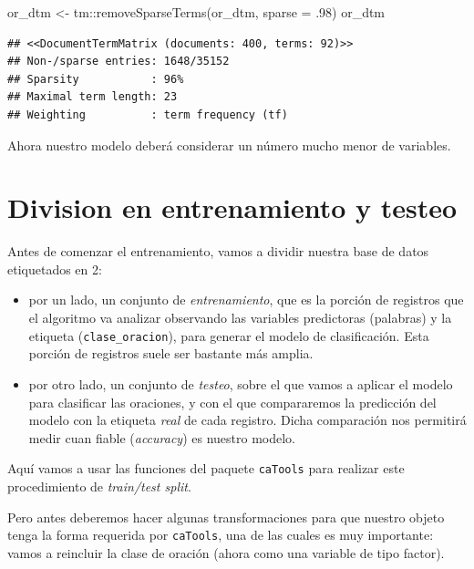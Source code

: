 \documentclass[
]{book}
\newenvironment{Shaded}{\begin{snugshade}}{\end{snugshade}}
\newcommand{\AttributeTok}[1]{\textcolor[rgb]{0.77,0.63,0.00}{#1}}
\newcommand{\DecValTok}[1]{\textcolor[rgb]{0.00,0.00,0.81}{#1}}
\newcommand{\FunctionTok}[1]{\textcolor[rgb]{0.00,0.00,0.00}{#1}}
\newcommand{\NormalTok}[1]{#1}
\newcommand{\OtherTok}[1]{\textcolor[rgb]{0.56,0.35,0.01}{#1}}
\newcommand{\SpecialCharTok}[1]{\textcolor[rgb]{0.00,0.00,0.00}{#1}}
\providecommand{\tightlist}{%
  \setlength{\itemsep}{0pt}\setlength{\parskip}{0pt}}
\begin{document}
\begin{Shaded}
\begin{Highlighting}[]
\NormalTok{or\_dtm }\OtherTok{\textless{}{-}}\NormalTok{ tm}\SpecialCharTok{::}\FunctionTok{removeSparseTerms}\NormalTok{(or\_dtm, }\AttributeTok{sparse =}\NormalTok{ .}\DecValTok{98}\NormalTok{)}
\NormalTok{or\_dtm}
\end{Highlighting}
\end{Shaded}

\begin{verbatim}
## <<DocumentTermMatrix (documents: 400, terms: 92)>>
## Non-/sparse entries: 1648/35152
## Sparsity           : 96%
## Maximal term length: 23
## Weighting          : term frequency (tf)
\end{verbatim}

Ahora nuestro modelo deberá considerar un número mucho menor de variables.

\hypertarget{division-en-entrenamiento-y-testeo}{%
\section{Division en entrenamiento y testeo}\label{division-en-entrenamiento-y-testeo}}

Antes de comenzar el entrenamiento, vamos a dividir nuestra base de datos etiquetados en 2:

\begin{itemize}
\tightlist
\item
  por un lado, un conjunto de \emph{entrenamiento}, que es la porción de registros que el algoritmo va analizar observando las variables predictoras (palabras) y la etiqueta (\texttt{clase\_oracion}), para generar el modelo de clasificación. Esta porción de registros suele ser bastante más amplia.
\item
  por otro lado, un conjunto de \emph{testeo}, sobre el que vamos a aplicar el modelo para clasificar las oraciones, y con el que compararemos la predicción del modelo con la etiqueta \emph{real} de cada registro. Dicha comparación nos permitirá medir cuan fiable (\emph{accuracy}) es nuestro modelo.
\end{itemize}

Aquí vamos a usar las funciones del paquete \texttt{caTools} para realizar este procedimiento de \emph{train/test split}.

Pero antes deberemos hacer algunas transformaciones para que nuestro objeto tenga la forma requerida por \texttt{caTools}, una de las cuales es muy importante: vamos a reincluir la clase de oración (ahora como una variable de tipo factor).
\end{document}
